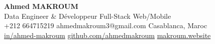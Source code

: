 \documentclass[10pt,a4paper,sans]{moderncv}
\begin{document}
\begin{center}
    {\fontsize{20}{22}\selectfont\textbf{Ahmed MAKROUM}}\\[0.7em]
    {\fontsize{13.2}{15.4}\selectfont Data Engineer \& Développeur Full-Stack Web/Mobile} \\[0.5em]
    {\fontsize{10.5}{12.3}\selectfont
      \faMobile\enspace +212 664715219 \quad
      \faEnvelope\enspace ahmedmakroum3@gmail.com \quad
      \faHome\enspace Casablanca, Maroc \\
      \faLinkedin\enspace \href{https://www.linkedin.com/in/ahmed-makroum/}{in/ahmed-makroum} \quad
      \faGithub\enspace \href{https://github.com/ahmedmakroum}{github.com/ahmedmakroum}
      \faGlobe\enspace \href{https://makroum.website}{makroum.website}
    }\\[1em]
\end{center}
\vspace{-14pt}

\end{document}
